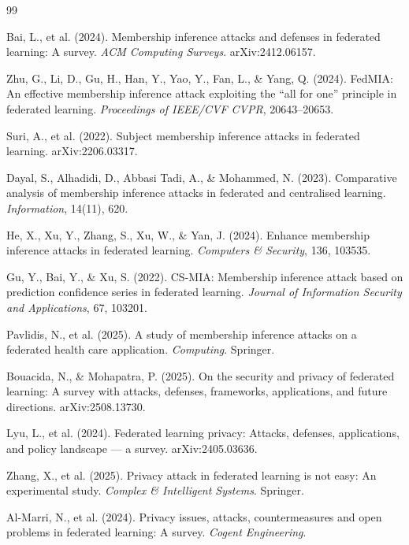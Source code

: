 \documentclass[12pt, a4paper]{report}
\begin{document}
\renewcommand{\bibname}{References}
\begin{thebibliography}{99}

Bai, L., et al. (2024).
Membership inference attacks and defenses in federated learning: A survey.
\textit{ACM Computing Surveys}.
arXiv:2412.06157.

Zhu, G., Li, D., Gu, H., Han, Y., Yao, Y., Fan, L., \& Yang, Q. (2024).
FedMIA: An effective membership inference attack exploiting the ``all for one''
principle in federated learning.
\textit{Proceedings of IEEE/CVF CVPR}, 20643--20653.

Suri, A., et al. (2022).
Subject membership inference attacks in federated learning.
arXiv:2206.03317.

Dayal, S., Alhadidi, D., Abbasi Tadi, A., \& Mohammed, N. (2023).
Comparative analysis of membership inference attacks in federated and
centralised learning.
\textit{Information}, 14(11), 620.

He, X., Xu, Y., Zhang, S., Xu, W., \& Yan, J. (2024).
Enhance membership inference attacks in federated learning.
\textit{Computers \& Security}, 136, 103535.

Gu, Y., Bai, Y., \& Xu, S. (2022).
CS-MIA: Membership inference attack based on prediction confidence series
in federated learning.
\textit{Journal of Information Security and Applications}, 67, 103201.

Pavlidis, N., et al. (2025).
A study of membership inference attacks on a federated health care application.
\textit{Computing}. Springer.

Bouacida, N., \& Mohapatra, P. (2025).
On the security and privacy of federated learning: A survey with attacks,
defenses, frameworks, applications, and future directions.
arXiv:2508.13730.

Lyu, L., et al. (2024).
Federated learning privacy: Attacks, defenses, applications, and policy
landscape --- a survey.
arXiv:2405.03636.

Zhang, X., et al. (2025).
Privacy attack in federated learning is not easy: An experimental study.
\textit{Complex \& Intelligent Systems}. Springer.

Al-Marri, N., et al. (2024).
Privacy issues, attacks, countermeasures and open problems in federated
learning: A survey.
\textit{Cogent Engineering}.


\end{thebibliography}
\end{document}
